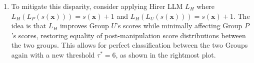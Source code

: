 \begin{example}
\begin{enumerate}
            \item To mitigate this disparity, consider applying Hirer LLM \(L_H\) where \(L_H(L_P(s(\bm{x}))) = s(\bm{x}) + 1\) and \(L_H(L_U(s(\bm{x}))) = s(\bm{x}) + 1\). The idea is that \(L_H\) improves Group \(U\)'s scores while minimally affecting Group \(P\)'s scores, restoring equality of post-manipulation score distributions between the two groups. This allows for perfect classification between the two Groups again with a new threshold \(\tau^* = 6\), as shown in the rightmost plot.
        \end{enumerate}
        



            





    \end{example}
    
